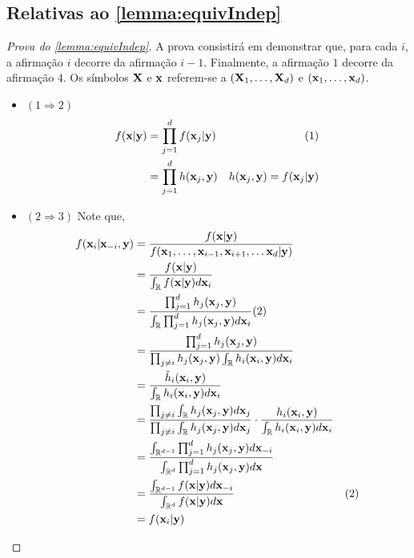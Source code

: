 \section{}

\subsection{Relativas ao \cref{lemma:equivIndep}}

\begin{proof}[Prova do \cref{lemma:equivIndep}]
 A prova consistirá em demonstrar que,
 para cada $i$, a afirmação $i$ decorre da afirmação $i-1$.
 Finalmente, a afirmação $1$ decorre da afirmação $4$.
 Os símbolos ${\mathbf{X}}$ e ${\mathbf{x}}$ referem-se a 
 $({\mathbf{X}}_1,\ldots,{\mathbf{X}}_d)$ e $({\mathbf{x}}_1,\ldots,{\mathbf{x}}_d)$. 
 \begin{itemize}
  \item $(1 \Longrightarrow 2)$
	\begin{align*}
	 f({\mathbf{x}}|{\mathbf{y}})	&= \prod_{j=1}^{d}{f({\mathbf{x}}_j|{\mathbf{y}})}  & (1) \\
	          &= \prod_{j=1}^{d}{h({\mathbf{x}}_j,{\mathbf{y}})}
	          & h({\mathbf{x}}_j,{\mathbf{y}}) = f({\mathbf{x}}_j|{\mathbf{y}})
	\end{align*}
	\vspace{-5mm}
  \item $(2 \Longrightarrow 3)$ Note que,
	\begin{align*}
	 f({\mathbf{x}}_i|{\mathbf{x}}_{-i},{\mathbf{y}})	
	 &= \frac{f({\mathbf{x}}|{\mathbf{y}})}{f({\mathbf{x}}_1,\ldots,{\mathbf{x}}_{i-1},{\mathbf{x}}_{i+1},\ldots{\mathbf{x}}_d|{\mathbf{y}})}	\\
	 &= \frac{f({\mathbf{x}}|{\mathbf{y}})}{\int_{\mathbb{R}}{f({\mathbf{x}}|{\mathbf{y}})d{\mathbf{x}}_i}} \\
	 &= \frac{\prod_{j=1}^{d}{h_j({\mathbf{x}}_j,{\mathbf{y}})}}
	 {\int_{\mathbb{R}}{\prod_{j=1}^{d}{h_j({\mathbf{x}}_j,{\mathbf{y}})}d{\mathbf{x}}_i}} (2) \\
	 &= \frac{\prod_{j=1}^{d}{h_j({\mathbf{x}}_j,{\mathbf{y}})}}
	 {\prod_{j \neq i}{h_j({\mathbf{x}}_j,{\mathbf{y}})} \int_{\mathbb{R}}{h_i({\mathbf{x}}_i,{\mathbf{y}})d{\mathbf{x}}_i}}	\\
	 &= \frac{\tilde{h}_i({\mathbf{x}}_i,{\mathbf{y}})}{\int_{\mathbb{R}}{h_i({\mathbf{x}}_i,{\mathbf{y}})d{\mathbf{x}}_i}}	\\
	 &= \frac{\prod_{j \neq i}{\int_{\mathbb{R}}{h_j({\mathbf{x}}_j,{\mathbf{y}})d{\mathbf{x}}_j}}}
	 {\prod_{j \neq i}{\int_{\mathbb{R}}{h_j({\mathbf{x}}_j,{\mathbf{y}})d{\mathbf{x}}_j}}} \cdot 
	 \frac{h_i({\mathbf{x}}_i,{\mathbf{y}})}{\int_{\mathbb{R}}{h_i({\mathbf{x}}_i,{\mathbf{y}})d{\mathbf{x}}_i}}	\\
	 &= \frac{\int_{\mathbb{R}^{d-1}}{\prod_{j=1}^{d}{h_j({\mathbf{x}}_j,{\mathbf{y}})}d{\mathbf{x}}_{-i}}}
	 {\int_{\mathbb{R}^{d}}{\prod_{j=1}^{d}{h_j({\mathbf{x}}_j,{\mathbf{y}})}d{\mathbf{x}}}}	\\
	 &= \frac{\int_{\mathbb{R}^{d-1}}{f({\mathbf{x}}|{\mathbf{y}})d{\mathbf{x}}_{-i}}}
	 {\int_{\mathbb{R}^{d}}{f({\mathbf{x}}|{\mathbf{y}})d{\mathbf{x}}}} & (2) \\
	 &= f({\mathbf{x}}_i|{\mathbf{y}})
	\end{align*}


\end{itemize}
\end{proof}
